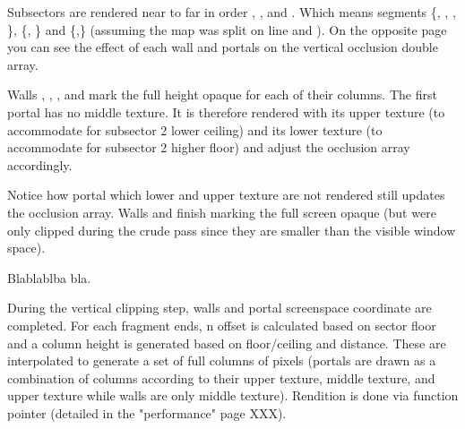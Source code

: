 Subsectors are rendered near to far in order , , and . Which means segments \{, , , \}, \{, \} and \{,\} (assuming the map was split on line  and ). On the opposite page you can see the effect of each wall and portals on the vertical occlusion double array.\\
\par
Walls , , , and  mark the full height opaque for each of their columns. The first portal  has no middle texture. It is therefore rendered with its upper texture (to accommodate for subsector 2 lower ceiling) and its lower texture (to accommodate for subsector 2 higher floor) and adjust the occlusion array accordingly.\\
\par
Notice how portal  which lower and upper texture are not rendered still updates the occlusion array. Walls  and  finish marking the full screen opaque (but were only clipped during the crude pass since they are smaller than the visible window space).




Blablablba bla.

\vspace{2mm}
 















During the vertical clipping step, walls and portal screenspace coordinate are completed. For each fragment ends, n  offset is calculated based on sector floor and a column height is generated based on floor/ceiling and distance. These are interpolated to generate a set of full columns of pixels (portals are drawn as a combination of columns according to their upper texture, middle texture, and upper texture while walls are only middle texture). Rendition is done via  function pointer (detailed in the "performance" page XXX).\\

\par
